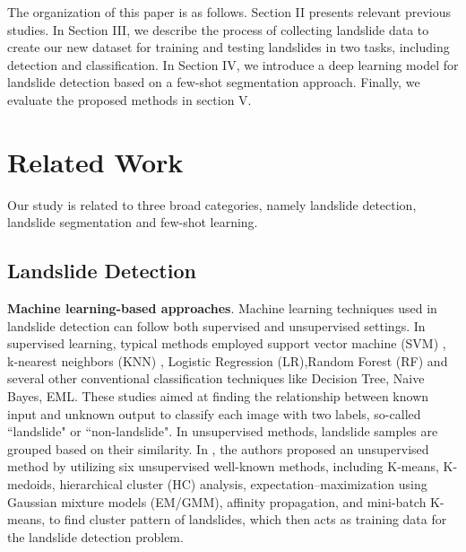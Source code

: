 \documentclass{ieeeaccess}
\begin{document}
The organization of this paper is as follows. Section II presents relevant previous studies. In Section III, we describe the process of collecting landslide data to create our new dataset for training and testing landslides in two tasks, including detection and classification. In Section IV, we introduce a deep learning model for landslide detection based on a few-shot segmentation approach. Finally, we evaluate the proposed methods in section V.








\section{Related Work}
\label{relatedwork}
Our study is related to three broad categories, namely landslide detection, landslide segmentation and few-shot learning.
\subsection{Landslide Detection} 

{\bf Machine learning-based approaches}. Machine learning techniques used in landslide detection can follow both supervised and unsupervised settings. In supervised learning, typical methods employed support vector machine (SVM) \cite{Haojie2021,Milos2009}, k-nearest neighbors (KNN) \cite{Milos2009}, Logistic Regression (LR),Random Forest (RF) \cite{Milos2009, ChanW2014} and several other conventional classification techniques like Decision Tree\cite{Chandra2012}, Naive Bayes\cite{Ilia2016}, EML\cite{Lian2014}. These studies aimed at finding the relationship between known input and unknown output to classify each image with two labels, so-called ``landslide" or ``non-landslide".  In unsupervised methods, landslide samples are grouped based on their similarity. In \cite{Badal2020}, the authors proposed an unsupervised method by utilizing six unsupervised well-known methods, including K-means, K-medoids, hierarchical cluster (HC) analysis, expectation–maximization using Gaussian mixture models (EM/GMM), affinity propagation, and mini-batch K-means, to find cluster pattern of landslides, which then acts as training data for the landslide detection problem.
\end{document}
